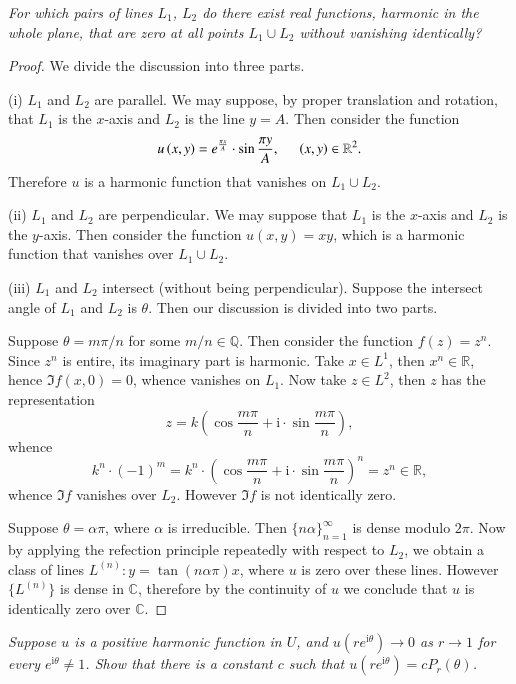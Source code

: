 \begin{problem}\em
For which pairs of lines $L_1$, $L_2$ do there exist real functions, harmonic in the whole plane, that are zero at all points $L_1\cup L_2$ without vanishing identically?
\end{problem}
\begin{proof}
We divide the discussion into three parts.\par
(i) $L_1$ and $L_2$ are parallel. We may suppose, by proper translation and rotation, that $L_1$ is the $x$-axis and $L_2$ is the line $y=A$. Then consider the function 
$$
u\left( x,y \right) =e^{\frac{\pi x}{A}}\cdot \sin \frac{\pi y}{A},\hspace{0.5cm}\left( x,y \right) \in \mathbb{R} ^2.
$$
Therefore $u$ is a harmonic function that vanishes on $L_1\cup L_2$.\par
(ii) $L_1$ and $L_2$ are perpendicular. We may suppose that $L_1$ is the $x$-axis and $L_2$ is the $y$-axis. Then consider the function $u(x,y)=xy$, which is a harmonic function that vanishes over $L_1\cup L_2$.\par
(iii) $L_1$ and $L_2$ intersect (without being perpendicular). Suppose the intersect angle of $L_1$ and $L_2$ is $\theta$. Then our discussion is divided into two parts.\par
Suppose $\theta=m\pi/n$ for some $m/n\in\mathbb{Q}$. Then consider the function $f(z)=z^n$. Since $z^n$ is entire, its imaginary part is harmonic. Take $x\in L^1$, then $x^n\in\mathbb{R}$, hence $\Im f(x,0)=0$, whence vanishes on $L_1$. Now take $z\in L^2$, then $z$ has the representation 
$$
z=k\left( \cos \frac{m\pi}{n}+\mathrm{i}\cdot \sin \frac{m\pi}{n} \right) ,
$$
whence 
$$
k^n\cdot \left( -1 \right) ^m=k^n\cdot \left( \cos \frac{m\pi}{n}+\mathrm{i}\cdot \sin \frac{m\pi}{n} \right) ^n=z^n\in \mathbb{R} ,
$$
whence $\Im f$ vanishes over $L_2$. However $\Im f$ is not identically zero.\par
Suppose $\theta=\alpha\pi$, where $\alpha$ is irreducible. Then $\{n\alpha\}_{n=1}^\infty$ is dense modulo $2\pi$. Now by applying the refection principle repeatedly with respect to $L_2$, we obtain a class of lines $L^{(n)}:y=\tan(n\alpha\pi)x$, where $u$ is zero over these lines. However $\{L^{(n)}\}$ is dense in $\mathbb{C}$, therefore by the continuity of $u$ we conclude that $u$ is identically zero over $\mathbb{C}$.
\end{proof}
\begin{problem}\em
Suppose $u$ is a positive harmonic function in $U$, and $u(re^{\mathrm{i}\theta})\to 0$ as $r\to 1$ for every $e^{\mathrm{i}\theta}\ne 1$. Show that there is a constant $c$ such that $u(re^{\mathrm{i}\theta})=cP_r(\theta)$.
\end{problem}
